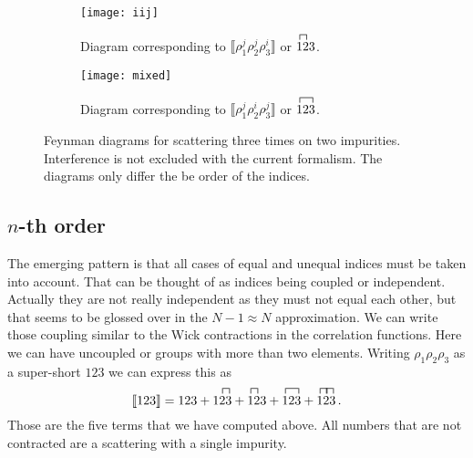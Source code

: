 \documentclass[11pt, english, fleqn, DIV=15, headinclude, BCOR=1cm]{scrartcl}
\newcommand\ensemble[1]{\llbracket #1 \rrbracket}
\begin{document}
\begin{figure}
    \centering
    \begin{subfigure}[c]{0.48\linewidth}
        \centering
        \texttt{[image: iij]}
        \caption{%
             Diagram corresponding to $\ensemble{\rho_1^j \rho_2^j \rho_3^i}$
             or $\contraction{}1{}2 123$.
        }
        \label{fig:iij}
    \end{subfigure}
    \hfill
    \begin{subfigure}[c]{0.48\linewidth}
        \centering
        \texttt{[image: mixed]}
        \caption{%
             Diagram corresponding to $\ensemble{\rho_1^j \rho_2^i \rho_3^j}$
             or $\contraction{}1{2}3 123$.
        }
        \label{fig:iji}
    \end{subfigure}
    \caption{%
        Feynman diagrams for scattering three times on two impurities.
        Interference is not excluded with the current formalism. The diagrams
        only differ the be order of the indices.
    }
    \label{fig:iji/mixed}
\end{figure}

\subsection{$n$-th order}

The emerging pattern is that all cases of equal and unequal indices must be
taken into account. That can be thought of as indices being coupled or
independent. Actually they are not really independent as they must not equal
each other, but that seems to be glossed over in the $N - 1 \approx N$
approximation. We can write those coupling similar to the Wick contractions in
the correlation functions. Here we can have uncoupled or groups with more than
two elements. Writing $\rho_1 \rho_2 \rho_3$ as a super-short $123$
we can express this as
\[
    \ensemble{123}
    = 123
    +
    \contraction{1}2{}3
    123
    +
    \contraction{}1{}2
    123
    +
    \contraction{}1{2}3
    123
    +
    \contraction{1}2{}3
    \contraction{}1{}2
    123 \,.
\]
Those are the five terms that we have computed above. All numbers that are not
contracted are a scattering with a single impurity.
\end{document}
